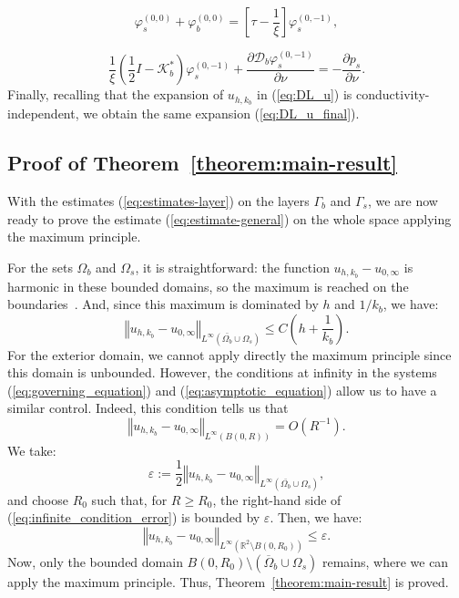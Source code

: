 \begin{equation}
\varphi_{s}^{(0,0)}+\varphi_{b}^{(0,0)}=\left[\tau-\frac{1}{\xi}\right]\varphi_{s}^{(0,-1)},\label{eq:phis0+phib0(bis)}
\end{equation}

\begin{equation}
\frac{1}{\xi}\left(\frac{1}{2}I-\mathcal{K}_{b}^{*}\right)\varphi_{s}^{(0,-1)}+\frac{\partial\mathcal{D}_{b}\varphi_{s}^{(0,-1)}}{\partial\nu}=-\frac{\partial p_s}{\partial\nu}.\label{eq:definition_phis_-1(bis)}
\end{equation}
 Finally, recalling that the expansion of $u_{h,k_{b}}$ in (\ref{eq:DL_u})
is conductivity-independent, we obtain the same expansion
(\ref{eq:DL_u_final}). \cqfd


\subsection{Proof of Theorem~\ref{theorem:main-result}}

With the estimates (\ref{eq:estimates-layer}) on the layers $\Gamma_{b}$
and $\Gamma_{s}$, we are now ready to prove the estimate (\ref{eq:estimate-general})
on the whole space applying the maximum principle.

For the sets $\Omega_{b}$ and $\Omega_{s}$, it is straightforward:
the function $u_{h,k_{b}}-u_{0,\infty}$ is harmonic in these
bounded domains, so the maximum is reached on the boundaries~\cite{taylor1}.
And, since this maximum is dominated by $h$ and $1/k_{b}$,
we have:
\[
\left\Vert u_{h,k_{b}}-u_{0,\infty}\right\Vert _{L^{\infty}(\bar{\Omega_{b}}
\cup\Omega_{s})}\leq C\left(h+\frac{1}{k_{b}}\right).
\]
For the exterior domain, we cannot apply directly the maximum
principle since this domain is unbounded. However, the conditions
at infinity in the systems (\ref{eq:governing_equation}) and
(\ref{eq:asymptotic_equation}) allow us to have a similar control.
Indeed, this condition tells us that
\begin{equation}
\left\Vert u_{h,k_{b}}-u_{0,\infty}\right\Vert
_{L^{\infty}(B(0,R))}=O(R^{-1}).\label{eq:infinite_condition_error}
\end{equation}
 We take:
\[
\varepsilon:=\frac{1}{2}\left\Vert u_{h,k_{b}}-u_{0,\infty}\right\Vert _{L^{\infty}(\bar{\Omega_{b}}\cup\Omega_{s})},
\]
 and choose $R_{0}$ such that, for $R\geq R_{0}$, the right-hand side of
(\ref{eq:infinite_condition_error}) is bounded by $\varepsilon$.
Then, we have:
\[
\left\Vert u_{h,k_{b}}-u_{0,\infty}\right\Vert
_{L^{\infty}(\mathbb{R}^{2}\setminus B(0,R_{0}))}\leq\varepsilon.
\]
 Now, only the bounded domain $B(0,R_{0})\setminus\left(\overline{\Omega}_{b}\cup\Omega_{s}\right)$
remains, where we can apply the maximum principle. Thus, Theorem~\ref{theorem:main-result}
is proved.




